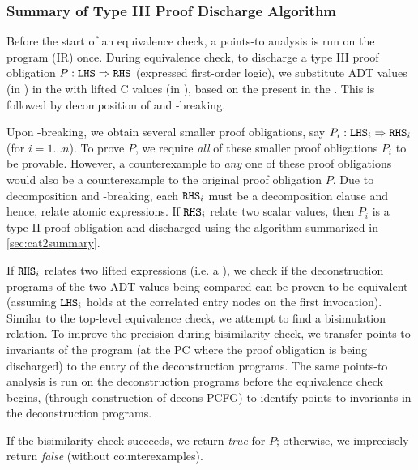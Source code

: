 \subsubsection{Summary of Type III Proof Discharge Algorithm}
\label{sec:cat3summary}

Before the start of an equivalence check, a points-to analysis is run on the \cprog{} program (IR) once.
During equivalence check, to discharge a type III proof obligation $P: {\tt LHS}{} \Rightarrow {\tt RHS}{}$
(expressed first-order logic), we substitute ADT values (in \sprog{}) in the \rhs{} with
lifted C values (in \cprog{}), based on the \recursiveRelations{} present in the \lhs{}.
This is followed by decomposition of \rhs{} and \rhs{}-breaking.

Upon \rhs{}-breaking, we obtain several smaller proof obligations,
say $P_i : {\tt LHS}{}_i \Rightarrow {\tt RHS}{}_i$ (for $i=1\ldots n$).
To prove $P$, we require {\em all} of these smaller proof obligations $P_i$ to be provable.
However, a counterexample to {\em any} one of these proof obligations would also be
a counterexample to the original proof obligation $P$.
Due to decomposition and \rhs{}-breaking, each ${\tt RHS}{}_i$ must be a decomposition clause
and hence, relate atomic expressions.
If ${\tt RHS}{}_i$ relate two scalar values, then $P_i$ is a type II proof obligation and
discharged using the algorithm summarized in \cref{sec:cat2summary}.

If ${\tt RHS}{}_i$ relates two lifted expressions (i.e. a \recursiveRelation{}),
we check if the deconstruction programs of the two ADT values being compared
can be proven to be equivalent (assuming ${\tt LHS}{}_i$ holds at the correlated entry nodes
on the first invocation).
Similar to the top-level equivalence check, we attempt to find a bisimulation relation.
To improve the precision during bisimilarity check, we transfer points-to invariants of the \cprog{}
program (at the PC where the proof obligation is being discharged) to the entry of the
deconstruction programs. The same points-to analysis is run on the deconstruction
programs before the equivalence check begins, (through construction of decons-PCFG)
to identify points-to invariants in the deconstruction programs.

If the bisimilarity check succeeds, we return {\em true} for $P$;
otherwise, we imprecisely return {\em false} (without counterexamples).



